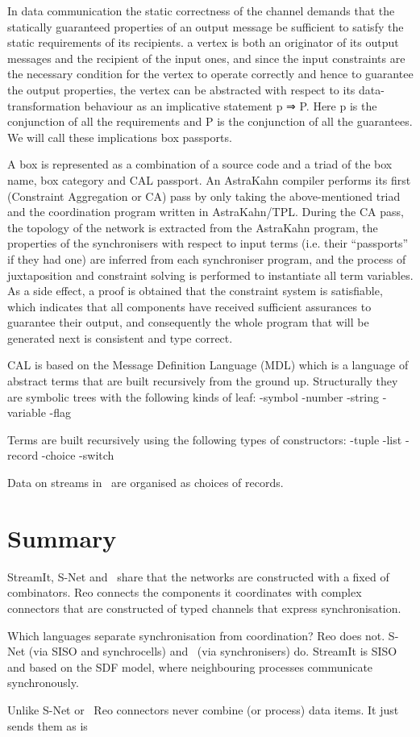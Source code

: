 In data communication the static correctness of the channel demands that the statically guaranteed properties of an output message be sufficient to satisfy the static requirements of its recipients.
a vertex is both an originator of its output messages and the recipient of the input ones, and since the input constraints are the necessary condition for the vertex to operate correctly and hence to guarantee the output properties, the vertex can be abstracted with
respect to its data-transformation behaviour as an implicative statement p ⇒ P. Here p is the conjunction of all the requirements and P is the conjunction of all the guarantees. We will call these implications box passports.

A box is represented as a combination of a source code and a triad of the box name, box category and CAL passport. An AstraKahn compiler performs its first (Constraint Aggregation or CA) pass by only taking the above-mentioned triad and the coordination program written in AstraKahn/TPL. During the CA pass, the topology of the network is extracted from the AstraKahn program, the properties of the synchronisers with respect to input terms (i.e. their “passports” if they had one) are inferred from each synchroniser program, and the process of juxtaposition and constraint solving is performed to instantiate all term variables. As a side effect, a proof is obtained that the constraint system is satisfiable, which indicates that all components have received sufficient assurances to guarantee their output, and consequently the whole program that will be generated next is consistent and type correct.

CAL is based on the Message Definition Language (MDL) which is a language of abstract terms that are built recursively from the ground up. Structurally they are symbolic trees with the following kinds of leaf:
-symbol
-number
-string
-variable
-flag

Terms are built recursively using the following types of constructors:
-tuple
-list
-record
-choice
-switch


Data on streams in \ak\ are organised as choices of records.




    \section{Summary}
StreamIt, S-Net and \ak\ share that the networks are constructed with a fixed of combinators. Reo connects the components it coordinates with complex connectors that are constructed of typed channels that express synchronisation.

Which languages separate synchronisation from coordination?
Reo does not.
S-Net (via SISO and synchrocells) and \ak\ (via synchronisers) do.
StreamIt is SISO and based on the SDF model, where neighbouring processes communicate synchronously.

Unlike S-Net or \ak\, Reo connectors never combine (or process) data items. It just sends them as is

